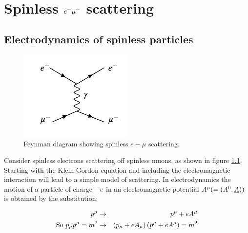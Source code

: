 
\chapter{Spinless \texorpdfstring{$\lowercase{e}^- \mu^-$}{EMu} scattering}

\section{Electrodynamics of spinless particles}

\begin{figure}[!htb]
  \begin{center}
    \includegraphics[width=0.5\textwidth]{images/web_feynman/image_20.png}
    \caption[Spinless $e-\mu$ scattering]{Feynman diagram showing spinless $e-\mu$ scattering.}
    \label{fig:ch7_EMuToEMu}
  \end{center}
\end{figure}

Consider spinless electrons scattering off spinless muons, as shown in figure \ref{fig:ch7_EMuToEMu}.  Starting with the Klein-Gordon equation and including the electromagnetic interaction will lead to a simple model of scattering.  In electrodynamics the motion of a particle of charge $-e$ in an electromagnetic potential $A^{\mu} (= (A^0,\underline{A}))$ is obtained by the substitution:

\begin{eqnarray*}
  p^{\mu} & \to & p^{\mu} + e A^{\mu} \\
  \textrm{So } p_{\mu}p^{\mu} = m^2 & \to & \left(p_{\mu} + e A_{\mu} \right)\left(p^{\mu} + e A^{\mu}\right) = m^2
\end{eqnarray*}

